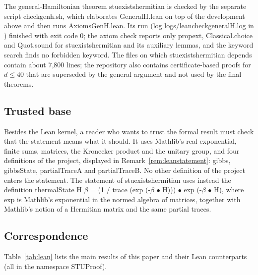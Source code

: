 \documentclass[11pt]{amsart}
\theoremstyle{definition}
\theoremstyle{remark}
\numberwithin{equation}{section}
\newcommand{\leanus}{\textunderscore\allowbreak}
\newcommand{\lean}[1]{{\ttfamily\let\_\leanus #1}}
\begin{document}
The general-Hamiltonian theorem \lean{stu\_exists\_hermitian} is checked by the separate script
\lean{check\_genh.sh}, which elaborates \lean{GeneralH.lean} on top of the development above and then runs
\lean{AxiomsGenH.lean}. Its run (log \lean{logs/lean\_check\_general\_H.log} in \cite{STUrepo}) finished
with exit code $0$; the axiom check reports only \lean{propext}, \lean{Classical.choice} and
\lean{Quot.sound} for \lean{stu\_exists\_hermitian} and its auxiliary lemmas, and the keyword search
finds no forbidden keyword. The files on which \lean{stu\_exists\_hermitian} depends contain about 7,800
lines; the repository also contains certificate-based proofs for $d\le40$ that are superseded by the
general argument and not used by the final theorems.

\subsection{Trusted base}
Besides the Lean kernel, a reader who wants to trust the formal result must check that the statement
means what it should. It uses Mathlib's real exponential, finite sums, matrices, the Kronecker product
and the unitary group, and four definitions of the project, displayed in
Remark~\ref{rem:leanstatement}: \lean{gibbs}, \lean{gibbsState}, \lean{partialTraceA} and
\lean{partialTraceB}. No other definition of the project enters the statement. The statement of
\lean{stu\_exists\_hermitian} uses instead the definition
\lean{thermalState H $\beta$ = (1 / trace (exp (-$\beta$ $\bullet$ H))) $\bullet$ exp (-$\beta$ $\bullet$ H)}, where
\lean{exp} is Mathlib's exponential in the normed algebra of matrices, together with Mathlib's notion of a
Hermitian matrix and the same partial traces.

\subsection{Correspondence}
Table~\ref{tab:lean} lists the main results of this paper and their Lean counterparts (all in the
namespace \lean{STUProof}).
\end{document}
